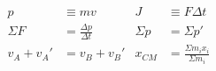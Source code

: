 \documentclass[14pt]{extarticle}
\begin{document}
\begin{align*}
  p &\equiv mv &
  J &\equiv F\Delta t \\
  \Sigma F &= \frac{\Delta p}{\Delta t} &
  \Sigma p &= \Sigma p ' \\
  v_A + v_A' &= v_B + v_B' &
  x_{CM} &= \frac{\Sigma m_i x_i}{\Sigma m_i}
\end{align*}
\end{document}
